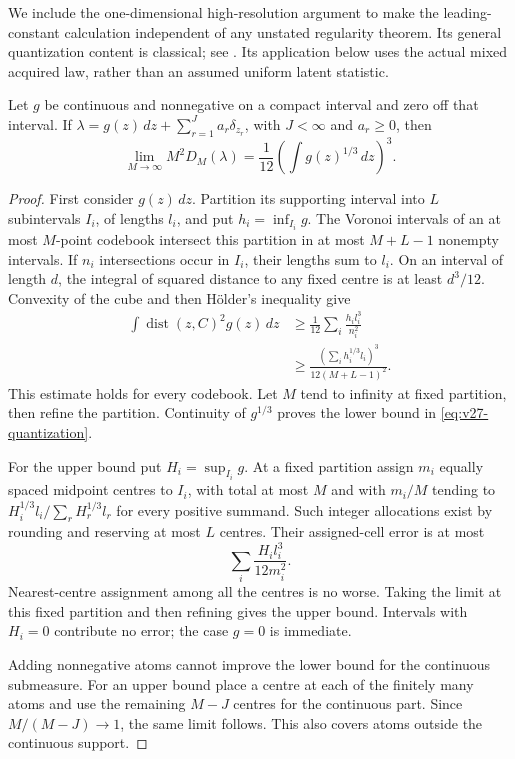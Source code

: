 We include the one-dimensional high-resolution argument to make the leading-constant calculation independent of any unstated regularity theorem. Its general quantization content is classical; see \cite{GrafLuschgy2000}. Its application below uses the actual mixed acquired law, rather than an assumed uniform latent statistic.

\begin{lemma}
\label{lem:v27-quantization}
Let $g$ be continuous and nonnegative on a compact interval and zero off that interval. If $\lambda=g(z)\,dz+\sum_{r=1}^J a_r\delta_{z_r}$, with $J<\infty$ and $a_r\ge0$, then
\begin{equation}\label{eq:v27-quantization}
          \lim_{M\to\infty}M^2D_M(\lambda)
                   =\frac1{12}\left(\int g(z)^{1/3}\,dz\right)^3.
\end{equation}
\end{lemma}
\begin{proof}
First consider $g(z)\,dz$. Partition its supporting interval into $L$ subintervals $I_i$, of lengths $l_i$, and put $h_i=\inf_{I_i}g$. The Voronoi intervals of an at most $M$-point codebook intersect this partition in at most $M+L-1$ nonempty intervals. If $n_i$ intersections occur in $I_i$, their lengths sum to $l_i$. On an interval of length $d$, the integral of squared distance to any fixed centre is at least $d^3/12$. Convexity of the cube and then H\"older's inequality give
\[
 \begin{split}
 \int\operatorname{dist}(z,C)^2g(z)\,dz
 &\ge\frac1{12}\sum_i\frac{h_i l_i^3}{n_i^2}\\
 &\ge\frac{(\sum_i h_i^{1/3}l_i)^3}
                         {12(M+L-1)^2}.
 \end{split}
\]
This estimate holds for every codebook. Let $M$ tend to infinity at fixed partition, then refine the partition. Continuity of $g^{1/3}$ proves the lower bound in \eqref{eq:v27-quantization}.

For the upper bound put $H_i=\sup_{I_i}g$. At a fixed partition assign $m_i$ equally spaced midpoint centres to $I_i$, with total at most $M$ and with $m_i/M$ tending to $H_i^{1/3}l_i/\sum_r H_r^{1/3}l_r$ for every positive summand. Such integer allocations exist by rounding and reserving at most $L$ centres. Their assigned-cell error is at most
\[
                         \sum_i\frac{H_i l_i^3}{12m_i^2}.
\]
Nearest-centre assignment among all the centres is no worse. Taking the limit at this fixed partition and then refining gives the upper bound. Intervals with $H_i=0$ contribute no error; the case $g=0$ is immediate.

Adding nonnegative atoms cannot improve the lower bound for the continuous submeasure. For an upper bound place a centre at each of the finitely many atoms and use the remaining $M-J$ centres for the continuous part. Since $M/(M-J)\to1$, the same limit follows. This also covers atoms outside the continuous support.
\end{proof}

